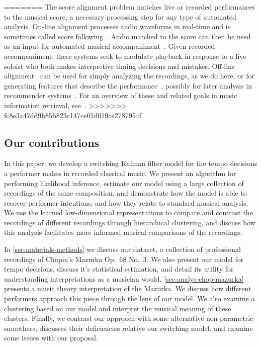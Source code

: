 \documentclass[aoas]{imsart}
\begin{document}
=======
The score alignment
problem matches live or recorded performances to the musical score, a necessary
processing step for any type of automated analysis. On-line alignment processes
audio waveforms in real-time 
and is sometimes called score
following~\citep{DannenbergRaphael2006,Cont2010,ContSchwarz2007,ArztWidmer2015}. Audio
matched to the score can then be used as an input for automated
musical accompaniment~\citep{Raphael2010,Vercoe1985,Dannenberg1985}.
Given recorded accompaniment, these systems seek to
modulate playback in response to a live soloist who both makes
interpretive timing decisions and mistakes. Off-line alignment~\citep{Earis2007} can be
used for simply analyzing the recordings, as we do here, or for
generating features that describe the
performance~\citep{ThickstunHarchaoui2017}, possibly for later analysis
in recommender
systems~\citep{McFeeLanckriet2011,OordDieleman2013}. For an overview
of these and related goals in music information retrieval, see~\citet{schedl2014music}.
>>>>>>> fc8e3a47dd9b85b823c147ce01d019ce2787954f

\subsection{Our contributions}
\label{sec:our-contributions}

In this paper, we develop a switching Kalman filter model for the
tempo decisions a performer makes in recorded classical music. We
present an algorithm for performing likelihood inference, estimate our
model using a large collection of recordings of the same composition,
and demonstrate how the model is able to recover performer intentions,
and how they relate to standard musical analysis. We use the learned
low-dimensional representations to compare and contrast the recordings
of different recordings through hierarchical clustering, and 
discuss how this analysis facilitates more informed musical
comparisons of the recordings.

In \autoref{sec:materials-methods} we discuss our dataset, a
collection of professional recordings of Chopin's Mazurka Op.\ 68 No.\
3. We also present our model for tempo decisions, discuss it's
statistical estimation, and detail its utility for understanding
interpretations as a musician would. \autoref{sec:analys-chop-mazurka}
presents a music theory interpretation of the Mazurka. We discuss how
different performers approach this piece through the lens of our model.
We also examine a clustering based on our model and interpret the musical
meaning of these clusters.  Finally, we contrast our approach with
some alternative non-parametric
smoothers, discusses their deficiencies relative our switching model,
and examine some issues with our proposal.
\end{document}
